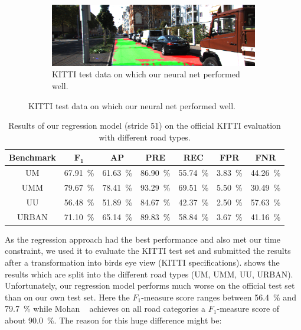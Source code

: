\begin{figure}[]
\begin{subfigure}[t]{\columnwidth}
        \includegraphics[width=\columnwidth]{figures/kitti_eval/Persp_uu_road_000082.png}
        \caption{KITTI test data on which our neural net performed well.}%
\label{fig:sfig2}
    \end{subfigure}
\end{figure}

\begin{table}[]
    \centering
    \begin{tabular}{c|cccccc}
    \toprule
    \textbf{Benchmark} & $\mathbf{F_1}$ & \textbf{AP} & \textbf{PRE} & \textbf{REC} & \textbf{FPR} & \textbf{FNR}\\
    \midrule
    UM    & \SI{67.91}{\percent} & \SI{61.63}{\percent} & \SI{86.90}{\percent} & \SI{55.74}{\percent} & \SI{3.83}{\percent} & \SI{44.26}{\percent}\\
    UMM   & \SI{79.67}{\percent} & \SI{78.41}{\percent} & \SI{93.29}{\percent} & \SI{69.51}{\percent} & \SI{5.50}{\percent} & \SI{30.49}{\percent}\\
    UU    & \SI{56.48}{\percent} & \SI{51.89}{\percent} & \SI{84.67}{\percent} & \SI{42.37}{\percent} & \SI{2.50}{\percent} & \SI{57.63}{\percent}\\
    URBAN & \SI{71.10}{\percent} & \SI{65.14}{\percent} & \SI{89.83}{\percent} & \SI{58.84}{\percent} & \SI{3.67}{\percent} & \SI{41.16}{\percent}\\
    \bottomrule
    \end{tabular}
    \caption{Results of our regression model (stride 51) on the official KITTI evaluation with different road types.}%
\label{tab:kitti}
\end{table}


As the regression approach had the best performance and also met our time
constraint, we used it to evaluate the KITTI test set and submitted the results
after a transformation into birds eye view (KITTI
specifications). shows the results which are split into the
different road types (UM, UMM, UU, URBAN).
Unfortunately, our regression model performs much worse on the official test
set than on our own test set. Here the $F_1$-measure score ranges between
\SI{56.4}{\percent} and \SI{79.7}{\percent} while Mohan ~\cite{Tarel2009}
achieves on all road categories a $F_1$-measure score of about
\SI{90.0}{\percent}. The reason for this huge difference might be: \\

